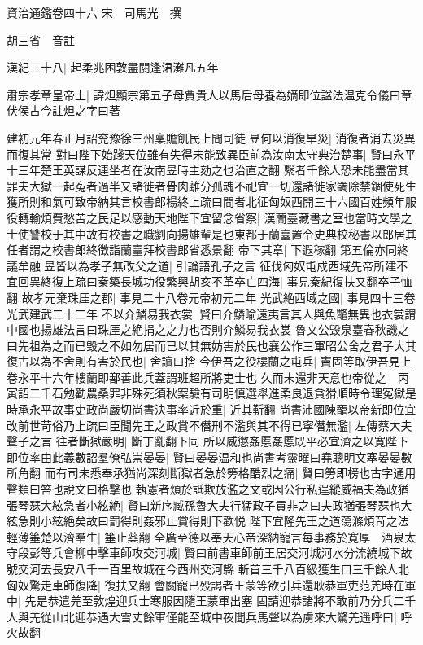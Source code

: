 資治通鑑卷四十六
宋　司馬光　撰

胡三省　音註

漢紀三十八|{
	起柔兆困敦盡閼逢涒灘凡五年}


肅宗孝章皇帝上|{
	諱炟顯宗第五子母賈貴人以馬后母養為嫡即位諡法温克令儀曰章伏侯古今註炟之字曰著}


建初元年春正月詔兖豫徐三州稟贍飢民上問司徒昱何以消復旱災|{
	消復者消去災異而復其常}
對曰陛下始踐天位雖有失得未能致異臣前為汝南太守典治楚事|{
	賢曰永平十三年楚王英謀反連坐者在汝南昱時主劾之也治直之翻}
繫者千餘人恐未能盡當其罪夫大獄一起寃者過半又諸徙者骨肉離分孤魂不祀宜一切還諸徙家蠲除禁錮使死生獲所則和氣可致帝納其言校書郎楊終上疏曰間者北征匈奴西開三十六國百姓頻年服役轉輸煩費愁苦之民足以感動天地陛下宜留念省察|{
	漢蘭臺藏書之室也當時文學之士使讐校于其中故有校書之職劉向揚雄輩是也東都于蘭臺置令史典校秘書以郎居其任者謂之校書郎終徵詣蘭臺拜校書郎省悉景翻}
帝下其章|{
	下遐稼翻}
第五倫亦同終議牟融昱皆以為孝子無改父之道|{
	引論語孔子之言}
征伐匈奴屯戍西域先帝所建不宜回異終復上疏曰秦築長城功役繁興胡亥不革卒亡四海|{
	事見秦紀復扶又翻卒子恤翻}
故孝元棄珠厓之郡|{
	事見二十八卷元帝初元二年}
光武絶西域之國|{
	事見四十三卷光武建武二十二年}
不以介鱗易我衣裳|{
	賢曰介鱗喻遠夷言其人與魚鼈無異也衣裳謂中國也揚雄法言曰珠厓之絶捐之之力也否則介鱗易我衣裳}
魯文公毁泉臺春秋譏之曰先祖為之而已毁之不如勿居而已以其無妨害於民也襄公作三軍昭公舍之君子大其復古以為不舍則有害於民也|{
	舍讀曰捨}
今伊吾之役樓蘭之屯兵|{
	竇固等取伊吾見上卷永平十六年樓蘭即鄯善此兵蓋謂班超所將吏士也}
久而未還非天意也帝從之　丙寅詔二千石勉勸農桑罪非殊死須秋案驗有司明慎選舉進柔良退貪猾順時令理寃獄是時承永平故事吏政尚嚴切尚書決事率近於重|{
	近其靳翻}
尚書沛國陳寵以帝新即位宜改前世苛俗乃上疏曰臣聞先王之政賞不僭刑不濫與其不得已寧僭無濫|{
	左傳蔡大夫聲子之言}
往者斷獄嚴明|{
	斷丁亂翻下同}
所以威懲姦慝姦慝既平必宜濟之以寛陛下即位率由此義數詔羣僚弘崇晏晏|{
	賢曰晏晏温和也尚書考靈曜曰堯聰明文塞晏晏數所角翻}
而有司未悉奉承猶尚深刻斷獄者急於篣格酷烈之痛|{
	賢曰篣即榜也古字通用聲類曰笞也說文曰格擊也}
執憲者煩於詆欺放濫之文或因公行私逞縱威福夫為政猶張琴瑟大絃急者小絃絶|{
	賢曰新序臧孫魯大夫行猛政子貢非之曰夫政猶張琴瑟也大絃急則小絃絶矣故曰罰得則姦邪止賞得則下歡悦}
陛下宜隆先王之道蕩滌煩苛之法輕薄箠楚以濟羣生|{
	箠止蘂翻}
全廣至德以奉天心帝深納寵言每事務於寛厚　酒泉太守段彭等兵會柳中擊車師攻交河城|{
	賢曰前書車師前王居交河城河水分流繞城下故號交河去長安八千一百里故城在今西州交河縣}
斬首三千八百級獲生口三千餘人北匈奴驚走車師復降|{
	復扶又翻}
會關寵已殁謁者王蒙等欲引兵還耿恭軍吏范羌時在軍中|{
	先是恭遣羌至敦煌迎兵士寒服因隨王蒙軍出塞}
固請迎恭諸將不敢前乃分兵二千人與羌從山北迎恭遇大雪丈餘軍僅能至城中夜聞兵馬聲以為虜來大驚羌遥呼曰|{
	呼火故翻}
